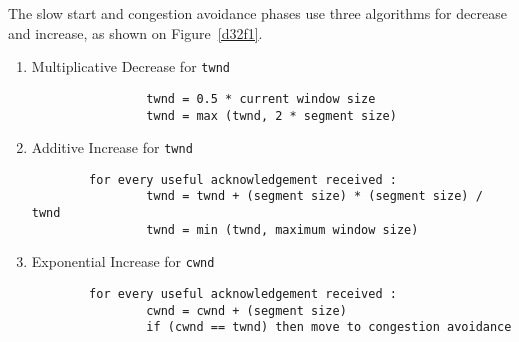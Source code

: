 The slow start and congestion avoidance phases use three algorithms
for decrease and increase, as shown on Figure~\ref{d32f1}.
\begin{enumerate}
        \item  Multiplicative Decrease for \texttt{twnd}

\begin{verbatim}
                twnd = 0.5 * current window size
                twnd = max (twnd, 2 * segment size)
        \end{verbatim}

        \item  Additive Increase for \texttt{twnd}
\begin{verbatim}
        for every useful acknowledgement received :
                twnd = twnd + (segment size) * (segment size) / twnd
                twnd = min (twnd, maximum window size)
        \end{verbatim}
        \item  Exponential Increase for \texttt{cwnd}
        \begin{verbatim}
        for every useful acknowledgement received :
                cwnd = cwnd + (segment size)
                if (cwnd == twnd) then move to congestion avoidance
        \end{verbatim}

\end{enumerate}
%
%
%
